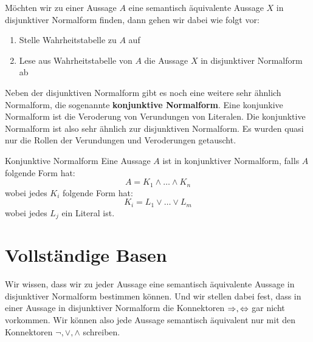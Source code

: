 \documentclass[../../main.tex]{subfiles}
\begin{document}
    Möchten wir zu einer Aussage $A$ eine semantisch äquivalente Aussage $X$ in disjunktiver Normalform
    finden, dann gehen wir dabei wie folgt vor:
    \begin{enumerate}
        \item Stelle Wahrheitstabelle zu $A$ auf
        \item Lese aus Wahrheitstabelle von $A$ die Aussage $X$ in disjunktiver Normalform ab
    \end{enumerate}

    Neben der disjunktiven Normalform gibt es noch eine 
    weitere sehr ähnlich Normalform, die sogenannte \textbf{konjunktive Normalform}.
    Eine konjunkive Normalform ist die Veroderung von Verundungen von Literalen. 
    Die konjunktive Normalform ist also sehr ähnlich zur disjunktiven Normalform. Es 
    wurden quasi nur die Rollen der Verundungen und Veroderungen getauscht.

    \begin{definition}{Konjunktive Normalform}
        Eine Aussage $A$ ist in konjunktiver Normalform, falls $A$ folgende Form hat:
        \[A = K_1 \land \dots \land K_n\]
        wobei jedes $K_i$ folgende Form hat:
        \[K_i = L_1 \lor \dots \lor L_m \]
        wobei jedes $L_j$ ein Literal ist.
    \end{definition}

    \section*{Vollständige Basen}
    Wir wissen, dass wir zu jeder Aussage eine semantisch äquivalente
    Aussage in 
    disjunktiver Normalform bestimmen können. Und wir stellen dabei fest,
    dass in einer Aussage in disjunktiver Normalform die Konnektoren 
    $\mathbin{\Rightarrow},\mathbin{\Leftrightarrow}$ gar nicht vorkommen.
    Wir können also jede Aussage semantisch äquivalent nur mit den Konnektoren 
    $\lnot,\lor,\land$ schreiben.
\end{document}
